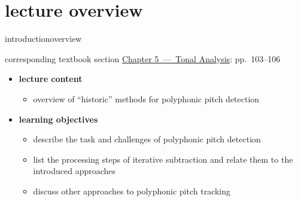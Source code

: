 




\subtitle{Module 5.4: Fundamental Frequency Detection in Polyphonic Signals}


	

    \section[overview]{lecture overview}
        \begin{frame}{introduction}{overview}
            \begin{block}{corresponding textbook section}
                    \href{http://ieeexplore.ieee.org/xpl/articleDetails.jsp?arnumber=6331122}{Chapter 5~---~Tonal Analysis}: pp.~103--106
            \end{block}

            \begin{itemize}
                \item   \textbf{lecture content}
                    \begin{itemize}
                        \item   overview of ``historic'' methods for polyphonic pitch detection
                    \end{itemize}
                \bigskip
                \item<2->   \textbf{learning objectives}
                    \begin{itemize}
                        \item   describe the task and challenges of polyphonic pitch detection
                        \item   list the processing steps of iterative subtraction and relate them to the introduced approaches
                        \item   discuss other approaches to polyphonic pitch tracking
                    \end{itemize}
            \end{itemize}
        \end{frame}

